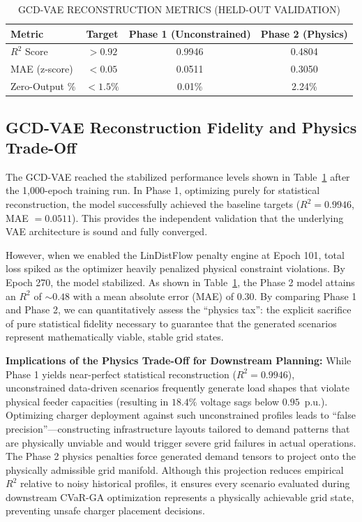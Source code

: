 \documentclass[conference]{IEEEtran}
\begin{document}
\begin{table}[htbp]
\centering
\caption{GCD-VAE RECONSTRUCTION METRICS (HELD-OUT VALIDATION)}
\label{tab:metrics}
\begin{tabular}{lccc}
\hline
\textbf{Metric} & \textbf{Target} & \textbf{Phase 1 (Unconstrained)} & \textbf{Phase 2 (Physics)} \\
\hline
$R^2$ Score & $> 0.92$ & 0.9946 & 0.4804 \\
MAE (z-score) & $< 0.05$ & 0.0511 & 0.3050 \\
Zero-Output \% & $< 1.5\%$ & 0.01\% & 2.24\% \\
\hline
\end{tabular}
\end{table}

\subsection{GCD-VAE Reconstruction Fidelity and Physics Trade-Off}

The GCD-VAE reached the stabilized performance levels shown in Table~\ref{tab:metrics} after the 1,000-epoch training run. In Phase 1, optimizing purely for statistical reconstruction, the model successfully achieved the baseline targets ($R^2 = 0.9946$, MAE $= 0.0511$). This provides the independent validation that the underlying VAE architecture is sound and fully converged.

However, when we enabled the LinDistFlow penalty engine at Epoch 101, total loss spiked as the optimizer heavily penalized physical constraint violations. By Epoch 270, the model stabilized. As shown in Table~\ref{tab:metrics}, the Phase 2 model attains an $R^2$ of $\sim 0.48$ with a mean absolute error (MAE) of 0.30. By comparing Phase 1 and Phase 2, we can quantitatively assess the ``physics tax'': the explicit sacrifice of pure statistical fidelity necessary to guarantee that the generated scenarios represent mathematically viable, stable grid states.

\textbf{Implications of the Physics Trade-Off for Downstream Planning:} While Phase 1 yields near-perfect statistical reconstruction ($R^2 = 0.9946$), unconstrained data-driven scenarios frequently generate load shapes that violate physical feeder capacities (resulting in $18.4\%$ voltage sags below $0.95$~p.u.). Optimizing charger deployment against such unconstrained profiles leads to ``false precision''—constructing infrastructure layouts tailored to demand patterns that are physically unviable and would trigger severe grid failures in actual operations. The Phase 2 physics penalties force generated demand tensors to project onto the physically admissible grid manifold. Although this projection reduces empirical $R^2$ relative to noisy historical profiles, it ensures every scenario evaluated during downstream CVaR-GA optimization represents a physically achievable grid state, preventing unsafe charger placement decisions.
\end{document}
